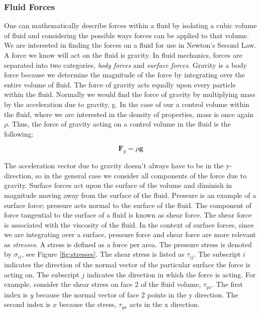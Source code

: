 \documentclass[twocolumn,12pth]{article}
\begin{document}
\subsubsection{Fluid Forces}

One can mathematically describe forces within a fluid by isolating a cubic volume of fluid and considering the possible ways forces can be applied to that volume. 
We are interested in finding the forces on a fluid for use in Newton's Second Law.
A force we know will act on the fluid is gravity.
In fluid mechanics, forces are separated into two categories, \textit{body forces} and \textit{surface forces}.
Gravity is a body force because we determine the magnitude of the force by integrating over the entire volume of fluid.
The force of gravity acts equally upon every particle within the fluid.
Normally we would find the force of gravity by multiplying mass by the acceleration due to gravity, g.
In the case of our a control volume within the fluid, where we are interested in the density of properties, mass is once again $\rho$.
Thus, the force of gravity acting on a control volume in the fluid is the following:

\begin{equation}
\mathbf{F}_g = \rho\mathbf{g}
\label{eq:grav}
\end{equation}

The acceleration vector due to gravity doesn't always have to be in the y-direction, so in the general case we consider all components of the force due to gravity.
Surface forces act upon the surface of the volume and diminish in magnitude moving away from the surface of the fluid.
Pressure is an example of a surface force; pressure acts normal to the surface of the fluid.
The component of force tangential to the surface of a fluid is known as shear force.
The shear force is associated with the viscosity of the fluid.
In the context of surface forces, since we are integrating over a surface, pressure force and shear force are more relevant as \textit{stresses}.
A stress is defined as a force per area.
The pressure stress is denoted by $\sigma_{ii}$, see Figure \ref{fig:stresses}.
The shear stress is listed as $\tau_{ij}$.
The subscript $i$ indicates the direction of the normal vector of the particular surface the force is acting on.
The subscript $j$ indicates the direction in which the force is acting.
For example, consider the shear stress on face 2 of the fluid volume, $\tau_{yx}$.
The first index is $y$ because the normal vector of face 2 points in the y direction.
The second index is $x$ because the stress, $\tau_{yx}$ acts in the x direction.
\end{document}
